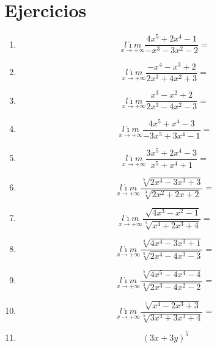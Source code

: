 \documentclass[oneside,spanish,letter]{article}
\begin{document}
\section{Ejercicios}
\begin{enumerate}
 \item $$\underset{x\rightarrow +\infty}{l\acute{\imath}m} \frac{4x^5+2x^4-1}{-x^3-3x^2-2}=$$
 \item $$\underset{x\rightarrow +\infty}{l\acute{\imath}m} \frac{-x^4-x^3+2}{2x^3+4x^2+3}=$$
 \item $$\underset{x\rightarrow +\infty}{l\acute{\imath}m} \frac{x^3-x^2+2}{2x^3-4x^2-3}=$$
 \item $$\underset{x\rightarrow +\infty}{l\acute{\imath}m} \frac{4x^5+x^4-3}{-3x^5+3x^4-1}=$$
 \item $$\underset{x\rightarrow +\infty}{l\acute{\imath}m} \frac{3x^5+2x^4-3}{x^5+x^4+1}=$$
 \item $$\underset{x\rightarrow +\infty}{l\acute{\imath}m} \frac{\sqrt[5]{2x^4-3x^3+3}}{\sqrt[3]{2x^2+2x+2}}=$$
 \item $$\underset{x\rightarrow +\infty}{l\acute{\imath}m} \frac{\sqrt[]{4x^3-x^2-1}}{\sqrt[5]{x^4+2x^3+4}}=$$
 \item $$\underset{x\rightarrow +\infty}{l\acute{\imath}m} \frac{\sqrt[4]{4x^4-3x^3+1}}{\sqrt[5]{2x^4-4x^3-3}}=$$
 \item $$\underset{x\rightarrow +\infty}{l\acute{\imath}m} \frac{\sqrt[5]{4x^5-4x^4-4}}{\sqrt[3]{2x^3-4x^2-2}}=$$
 \item $$\underset{x\rightarrow +\infty}{l\acute{\imath}m} \frac{\sqrt[5]{x^4-2x^3+3}}{\sqrt[5]{3x^4+3x^3+4}}=$$
\item $$(3x+3y)^5$$
 \end{enumerate}
  \newpage
\end{document}
